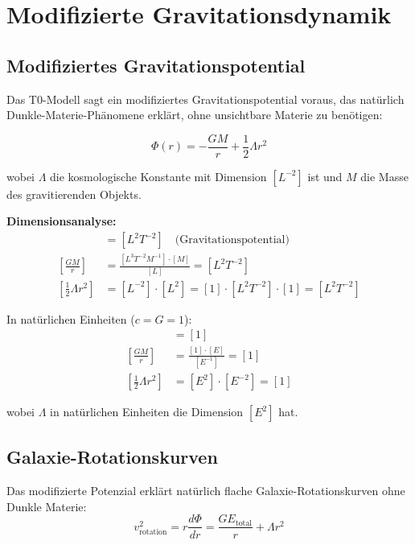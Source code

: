 \documentclass[12pt,a4paper]{report}
\begin{document}
	\section{Modifizierte Gravitationsdynamik}
	\label{sec:modified_gravitational_dynamics}
	
\subsection{Modifiziertes Gravitationspotential}
\label{subsec:modified_potential}

Das T0-Modell sagt ein modifiziertes Gravitationspotential voraus, das natürlich Dunkle-Materie-Phänomene erklärt, ohne unsichtbare Materie zu benötigen:

\begin{equation}
	\Phi(r) = -\frac{GM}{r} + \frac{1}{2}\Lambda r^2
	\label{eq:modified_gravitational_potential}
\end{equation}

wobei $\Lambda$ die kosmologische Konstante mit Dimension $[L^{-2}]$ ist und $M$ die Masse des gravitierenden Objekts.

\textbf{Dimensionsanalyse:}
\begin{align}
	[\Phi(r)] &= [L^2 T^{-2}] \quad \text{(Gravitationspotential)} \\
	\left[\frac{GM}{r}\right] &= \frac{[L^3 T^{-2} M^{-1}] \cdot [M]}{[L]} = [L^2 T^{-2}] \\
	\left[\frac{1}{2}\Lambda r^2\right] &= [L^{-2}] \cdot [L^2] = [1] \cdot [L^2 T^{-2}] \cdot [1] = [L^2 T^{-2}]
\end{align}

In natürlichen Einheiten ($c = G = 1$):
\begin{align}
	[\Phi(r)] &= [1] \\
	\left[\frac{GM}{r}\right] &= \frac{[1] \cdot [E]}{[E^{-1}]} = [1] \\
	\left[\frac{1}{2}\Lambda r^2\right] &= [E^2] \cdot [E^{-2}] = [1]
\end{align}

wobei $\Lambda$ in natürlichen Einheiten die Dimension $[E^2]$ hat.	
\subsection{Galaxie-Rotationskurven}
\label{subsec:galaxy_rotation_curves}

Das modifizierte Potenzial erklärt natürlich flache Galaxie-Rotationskurven ohne Dunkle Materie:
\begin{equation}
	v_{\text{rotation}}^2 = r \frac{d\Phi}{dr} = \frac{GE_{\text{total}}}{r} + \Lambda r^2
\end{equation}
\end{document}
